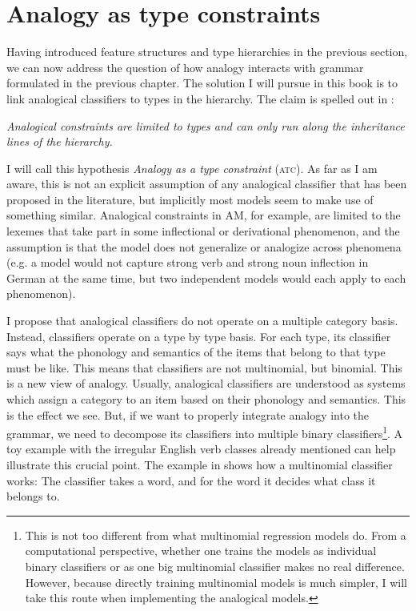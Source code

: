 
\section{Analogy as type constraints}


Having introduced feature structures and type hierarchies in the previous section, we can now address the question of how analogy interacts with grammar formulated in the previous chapter. The solution I will pursue in this book is to link analogical classifiers to types in the hierarchy. The claim is spelled out in :

\begin{exe}
    \ex \label{claim-book} \emph{Analogical constraints are limited to types and can only run along the inheritance lines of the hierarchy.}
\end{exe}

I will call this hypothesis \emph{Analogy as a type constraint} (\textsc{atc}). As far as I am aware, this is not an explicit assumption of any analogical classifier that has been proposed in the literature, but implicitly most models seem to make use of something similar. Analogical constraints in AM, for example, are limited to the lexemes that take part in some inflectional or derivational phenomenon, and the assumption is that the model does not generalize or analogize across phenomena (e.g. a model would not capture strong verb and strong noun inflection in German at the same time, but two independent models would each apply to each phenomenon).

I propose that analogical classifiers do not operate on a multiple category basis. Instead, classifiers operate on a type by type basis. For each type, its classifier says what the phonology and semantics of the items that belong to that type must be like. This means that classifiers are not multinomial, but binomial. This is a new view of analogy. Usually, analogical classifiers are understood as systems which assign a category to an item based on their phonology and semantics. This is the effect we see. But, if we want to properly integrate analogy into the grammar, we need to decompose its classifiers into multiple binary classifiers\footnote{This is not too different from what multinomial regression models do. From a computational perspective, whether one trains the models as individual binary classifiers or as one big multinomial classifier makes no real difference. However, because directly training multinomial models is much simpler, I will take this route when implementing the analogical models.}. A toy example with the irregular English verb classes already mentioned can help illustrate this crucial point. The example in  shows how a multinomial classifier works: The classifier takes a word, and for the word it decides what class it belongs to.

